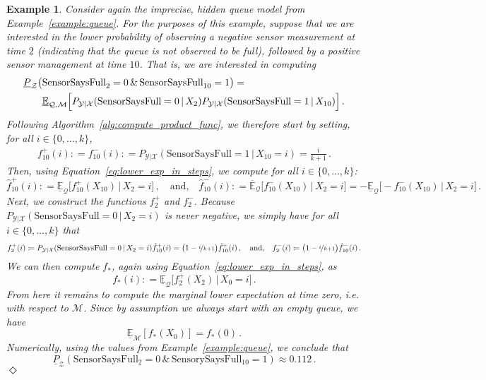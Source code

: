 \documentclass[3p]{elsarticle}
\newtheorem{example}{Example}[section]
\newcommand{\states}{\mathcal{X}}
\newcommand{\observs}{\mathcal{Y}}
\newcommand{\rateset}{\mathcal{Q}}
\newcommand{\coloneqq}{:\!=}
\newcommand{\exampleend}{\hfill$\Diamond$}
\begin{document}
\begin{example}
Consider again the imprecise, hidden queue model from Example~\ref{example:queue}. For the purposes of this example, suppose that we are interested in the lower probability of observing a negative sensor measurement at time $2$ (indicating that the queue is not observed to be full), followed by a positive sensor management at time $10$. That is, we are interested in computing
\begin{align*}
\underline{P}_\mathcal{Z}\bigl( &\text{SensorSaysFull}_2=0\,\&\, \text{SensorSaysFull}_{10}=1 \bigr) = \\
&\underline{\mathbb{E}}_{\rateset,\mathcal{M}}\Bigl[ P_{\observs\vert\states}(\text{SensorSaysFull}=0\,\vert\,X_2)P_{\observs\vert\states}(\text{SensorSaysFull}=1\,\vert\,X_{10}) \Bigr]\,.
\end{align*}
Following Algorithm~\ref{alg:compute_product_func}, we therefore start by setting, for all $i\in\{0,\ldots,k\}$,
\begin{align*}
f^+_{10}(i) \coloneqq f^-_{10}(i) \coloneqq P_{\observs\vert\states}(\text{SensorSaysFull}=1\,\vert\,X_{10}=i) = \frac{i}{k+1}\,.
\end{align*}
Then, using Equation~\eqref{eq:lower_exp_in_steps}, we compute for all $i\in\{0,\ldots,k\}$:
\begin{equation*}
\hat{f}^+_{10}(i) \coloneqq \underline{\mathbb{E}}_\rateset\bigl[f^+_{10}(X_{10})\,\vert\,X_2=i\bigr]\,,\quad\text{and,}\quad \hat{f}^-_{10}(i) \coloneqq \overline{\mathbb{E}}_\rateset\bigl[f^-_{10}(X_{10})\,\vert\,X_2=i\bigr] = -\underline{\mathbb{E}}_\rateset\bigl[-f^-_{10}(X_{10})\,\vert\,X_2=i\bigr]\,.
\end{equation*}
Next, we construct the functions $f^+_2$ and $f^-_2$. Because $P_{\observs\vert\states}(\text{SensorSaysFull}=0\,\vert\,X_2=i)$ is never negative, we simply have for all $i\in\{0,\ldots,k\}$ that
\begin{equation*}
f^+_2(i) \coloneqq P_{\observs\vert\states}(\text{SensorSaysFull}=0\,\vert\,X_2=i)\hat{f}^+_{10}(i) = \bigl(1-\nicefrac{i}{k+1}\bigr)\hat{f}^+_{10}(i)\,,\quad\text{and,}\quad
f^-_2(i)\coloneqq \bigl(1-\nicefrac{i}{k+1}\bigr)\hat{f}^-_{10}(i)\,.
\end{equation*}
We can then compute $f_*$, again using Equation~\eqref{eq:lower_exp_in_steps}, as
\begin{equation*}
f_*(i) \coloneqq \underline{\mathbb{E}}_{\rateset}\bigl[ f_2^+(X_2)\,\vert\,X_0=i \bigr]\,.
\end{equation*}
From here it remains to compute the marginal lower expectation at time zero, i.e. with respect to $\mathcal{M}$. Since by assumption we always start with an empty queue, we have
\begin{equation*}
\underline{\mathbb{E}}_\mathcal{M}[f_*(X_0)] = f_*(0)\,.
\end{equation*}
Numerically, using the values from Example~\ref{example:queue}, we conclude that
\begin{equation*} \underline{P}_\mathcal{Z}(\text{SensorSaysFull}{}_2=0\,\&\,\text{SensorySaysFull}{}_{10}=1)\approx 0.112\,.
\end{equation*}
\exampleend
\end{example}
\end{document}
